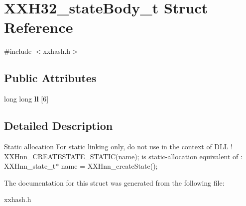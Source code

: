 \hypertarget{structXXH32__stateBody__t}{}\section{X\+X\+H32\+\_\+state\+Body\+\_\+t Struct Reference}
\label{structXXH32__stateBody__t}


{\ttfamily \#include $<$xxhash.\+h$>$}

\subsection*{Public Attributes}
\begin{DoxyCompactItemize}
\item 
\hypertarget{structXXH32__stateBody__t_a28e284a12363817ba19669653239930e}{}long long {\bfseries ll} \mbox{[}6\mbox{]}\label{structXXH32__stateBody__t_a28e284a12363817ba19669653239930e}

\end{DoxyCompactItemize}


\subsection{Detailed Description}
Static allocation For static linking only, do not use in the context of D\+L\+L ! X\+X\+Hnn\+\_\+\+C\+R\+E\+A\+T\+E\+S\+T\+A\+T\+E\+\_\+\+S\+T\+A\+T\+I\+C(name); is static-\/allocation equivalent of \+: X\+X\+Hnn\+\_\+state\+\_\+t$\ast$ name = X\+X\+Hnn\+\_\+create\+State(); 

The documentation for this struct was generated from the following file\+:\begin{DoxyCompactItemize}
\item 
xxhash.\+h\end{DoxyCompactItemize}
